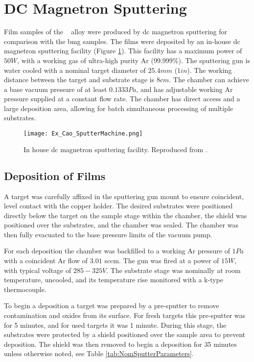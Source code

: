 \section{DC Magnetron Sputtering}
Film samples of the \MgZnCa~ alloy were produced by \gls{dc} magnetron sputtering for comparison with the \gls{bmg} samples. The films were deposited by an in-house \acrshort{dc} magnetron sputtering facility (Figure \ref{fig:CaoSputtering}). This facility has a maximum power of $50 W$, with a working gas of ultra-high purity Ar (99.999\%). The sputtering gun is water cooled with a nominal target diameter of $25.4 mm$ ($1 in$). The working distance between the target and substrate stage is $8 cm$. The chamber can achieve a base vacuum pressure of at least $0.1333 Pa$, and has adjustable working Ar pressure supplied at a constant flow rate. The chamber has direct access and a large deposition area, allowing for batch simultaneous processing of multiple substrates.

\begin{figure}[htbp]
	\centering
	\texttt{[image: Ex\_Cao\_SputterMachine.png]}
	\caption[In-house ad hoc \acrshort{dc} magnetron sputtering facility.]{In house \acrshort{dc} magnetron sputtering facility. Reproduced from \cite{Cao2013}.}
	\label{fig:CaoSputtering}
\end{figure}

\subsection{Deposition of Films} \label{sec:DepositionOfFilms}
A target was carefully affixed in the sputtering gun mount to ensure coincident, level contact with the copper holder. The desired substrates were positioned directly below the target on the sample stage within the chamber, the shield was positioned over the substrates, and the chamber was sealed. The chamber was then fully evacuated to the base pressure limits of the vacuum pump. 

For each deposition the chamber was backfilled to a working Ar pressure of $1Pa$ with a coincident Ar flow of $3.01$ \acrshort{sccm}. The gun was fired at a power of $15W$, with typical voltage of $285-325V$. The substrate stage was nominally at room temperature, uncooled, and its temperature rise monitored with a k-type thermocouple. 

To begin a deposition a target was prepared by a pre-sputter to remove contamination and oxides from its surface. For fresh targets this pre-sputter was for 5 minutes, and for used targets it was 1 minute. During this stage, the substrates were protected by a shield positioned over the sample area to prevent deposition. The shield was then removed to begin a deposition for 35 minutes unless otherwise noted, see Table \ref{tab:NomSputterParameters}. 

